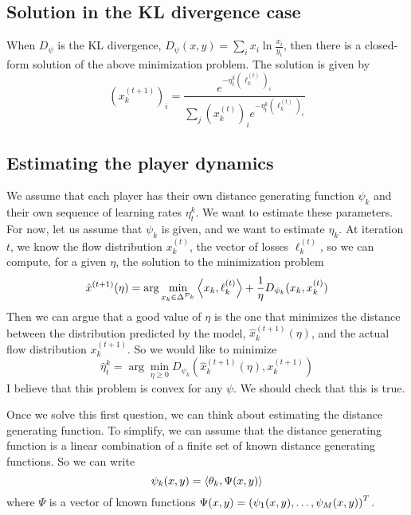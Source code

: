\documentclass[10pt,a4paper]{article}
\begin{document}
\subsection{Solution in the KL divergence case}
When $D_\psi$ is the KL divergence, $D_\psi(x, y) = \sum_i x_i \ln \frac{x_i}{y_i}$, then there is a closed-form solution of the above minimization problem. The solution is given by
\[
(x_k^{(t+1)})_i = \frac{e^{-\eta_t^k (\ell^{(t)}_k)_i}}{\sum_j (x_k^{(t)})_i e^{-\eta_t^k (\ell^{(t)}_k)_i}}
\]



\subsection{Estimating the player dynamics}
We assume that each player has their own distance generating function $\psi_k$ and their own sequence of learning rates $\eta_t^k$. We want to estimate these parameters. For now, let us assume that $\psi_k$ is given, and we want to estimate $\eta_k$. At iteration $t$, we know the flow distribution $x^{(t)}_k$, the vector of losses $\ell_k^{(t)}$, so we can compute, for a given $\eta$, the solution to the minimization problem
\[
\hat x^{(t+1)}(\eta) = \arg\min_{x_k \in \Delta^{\mathcal{P}_k}} \left\langle x_k, \ell^{(t)}_k \right\rangle + \frac{1}{\eta} D_{\psi_k}(x_k, x^{(t)}_k)
\]
Then we can argue that a good value of $\eta$ is the one that minimizes the distance between the distribution predicted by the model, $\hat x^{(t+1)}_k(\eta)$, and the actual flow distribution $x^{(t+1)}_k$. So we would like to minimize
\[
\hat \eta^k_t = \arg\min_{\eta \geq 0} D_{\psi_k}(\hat x_k^{(t+1)}(\eta), x^{(t+1)}_k)
\]
I believe that this problem is convex for any $\psi$. We should check that this is true.


Once we solve this first question, we can think about estimating the distance generating function. To simplify, we can assume that the distance generating function is a linear combination of a finite set of known distance generating functions. So we can write
\[
\psi_k(x, y) = \left\langle \theta_k, \Psi(x, y) \right\rangle
\]
where $\Psi$ is a vector of known functions $\Psi(x, y) = \left( \psi_1(x, y), \dots, \psi_M(x, y) \right)^T$.
\end{document}
